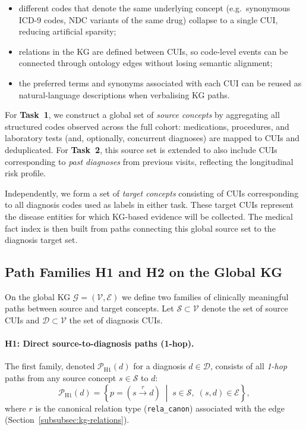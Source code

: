 \begin{itemize}
    \item different codes that denote the same underlying concept (e.g.\ synonymous ICD-9 codes, NDC variants of the same drug) collapse to a single CUI, reducing artificial sparsity;
    \item relations in the KG are defined between CUIs, so code-level events can be connected through ontology edges without losing semantic alignment;
    \item the preferred terms and synonyms associated with each CUI can be reused as natural-language descriptions when verbalising KG paths.
\end{itemize}

For \textbf{Task~1}, we construct a global set of \emph{source concepts} by aggregating all structured codes observed across the full cohort: medications, procedures, and laboratory tests (and, optionally, concurrent diagnoses) are mapped to CUIs and deduplicated. For \textbf{Task~2}, this source set is extended to also include CUIs corresponding to \emph{past diagnoses} from previous visits, reflecting the longitudinal risk profile.

Independently, we form a set of \emph{target concepts} consisting of CUIs corresponding to all diagnosis codes used as labels in either task. These target CUIs represent the disease entities for which KG-based evidence will be collected. The medical fact index is then built from paths connecting this global source set to the diagnosis target set.


\subsection{Path Families H1 and H2 on the Global KG}
\label{subsec:fact-index-path-families}

On the global KG $\mathcal{G} = (\mathcal{V}, \mathcal{E})$ we define two families of clinically meaningful paths between source and target concepts. Let $\mathcal{S} \subset \mathcal{V}$ denote the set of source CUIs and $\mathcal{D} \subset \mathcal{V}$ the set of diagnosis CUIs.

\paragraph{H1: Direct source-to-diagnosis paths (1-hop).}

The first family, denoted $\mathcal{P}_{\text{H1}}(d)$ for a diagnosis $d \in \mathcal{D}$, consists of all \emph{1-hop} paths from any source concept $s \in \mathcal{S}$ to $d$:
\begin{equation}
    \mathcal{P}_{\text{H1}}(d)
    =
    \left\{ p = (s \xrightarrow{r} d) \;\middle|\; s \in \mathcal{S},\; (s,d) \in \mathcal{E} \right\},
\end{equation}
where $r$ is the canonical relation type (\texttt{rela\_canon}) associated with the edge (Section~\ref{subsubsec:kg-relations}).

